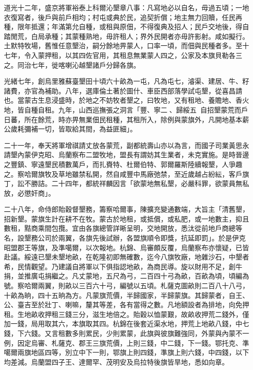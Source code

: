 \begin{pinyinscope}
道光十二年，盛京將軍裕泰上科爾沁墾章八事：凡寫地必以自名，毋過五頃；一地衣復寫者，後戶與前戶相均；村屯或典於民，追契折償；地主無力回贖，任民再種，限年抵還；年滿第允自種，或租與原佃，不得復典及招人；民戶交地後，得自踏閒荒，白局承種；其蒙種熟地，毋許租人；界外民開者亦毋許影射。咸如擬行。土默特牧場，舊惟任意墾治，嗣分餘地畀蒙人，口率一頃，而佃與民種者多。至十七年，令入蒙押租，以其四佐官用，其租息無業蒙人四之，公家及本旗貝勒各三之。同治七年，徙喀喇沁越墾諸戶分歸各旗。

光緒七年，創烏里雅蘇臺墾田十頃六十畝為一屯，凡為屯七，濬渠、建居、牛、籽諸費，亦官為補助。八年，選庫倫土著於圖什、車臣西部落學試屯墾，從喜昌請也。當蒙古生息浸盛時，於地之不妨牧者墾之，曰牧地，又有租地、養贍地、香火地，皆自種自租。九年，山西巡撫張之洞言「豐、寧二、歸綏五，自招墾蒙荒而戶日蕃，所在餘荒，時亦畀無業佃民租種，其租所入，除例與蒙旗外，凡開地基本薪公歲耗彌補一切，皆取給其間，為益匪細」。

二十一年，奉天將軍增祺請丈放各蒙荒，副都統壽山亦以為言，而國子司業黃思永請墾內蒙伊克昭、烏蘭察布二盟牧地，盟長有謂妨其生業者，未克實施。是時晉邊之豐鎮、寧遠墾民積數萬戶，而扎賚特、杜爾伯特、郭爾羅斯陸續報墾，人爭趣之。察哈爾旗牧及草地雖禁私開，然自咸豐中馬廠弛禁，至近歲越占紛紜，客戶旗丁，訟不勝詰。二十四年，都統祥麟因言「欲蒙地無私墾，必嚴科罪，欲蒙員無私放，必懲奸商」。

二十八年，命侍郎貽穀督墾務，籌察哈爾事，陳擴充變通數端，大旨主「清舊墾，招新墾。蒙旗生計在耕不在牧。蒙古於地租，或抵償，或私肥，或一地數主，抑且數租，黠商乘間包攬。宜由各旗總管詳晰呈明，交地開放，悉汰從前地戶商總等名，設墾務公司於兩翼，各旗先後試辦，各盟旗順令即獎，抗延即罰」。於是伊克昭盟郡王等旗，及準噶爾，以次報地。杭錦、烏審頗反覆，烏蘭察布亦懷疑，已皆赴議。綏遠已墾未墾地畝，在乾隆初即無確數，迄今八旗牧廠，地雜沙石，中墾者希，民情觀望。乃建議自將軍以下俱指認地畝，為商民導。旋以財用不足，創牛捐，並推廣屯捐繼之。凡丈蒙地，五尺為弓，二百四十弓為畝，百畝為頃，頃編為號。察哈爾兩翼，則畝以三百六十弓，編號以五頃。札薩克圖畝則二百八十八弓，十畝為晌，四十五晌為方。凡蒙旗荒價，半歸國家，半歸蒙旗。其歸蒙者，自王、公、臺吉至於壯丁、喇嘛，釐其等差，各有當得之數。凡地額設者為排地，向免押租。生地畝收押租三錢三分，滋生地倍之。貽穀以恤蒙艱，故畝收押荒二錢外，僅加一錢，局用取其六，本旗取其四。杭錦在後套近渠水地，押荒上地畝八錢，中七錢，下六錢。又言租數多則累民，少則累蒙，此旗與彼旗難強同，外蒙與內蒙不一例，因定烏審、札薩克、郡王三旗荒價，上則三錢，中二錢，下一錢。鄂托克、準噶爾兩旗地區四等，別立中下一則，鄂旗上則四錢，準旗上則六錢，中四錢，以下均差減。烏蘭盟四子王、達爾罕、茂明安及烏拉特後旗皆旱地，悉如向章。


\end{pinyinscope}
